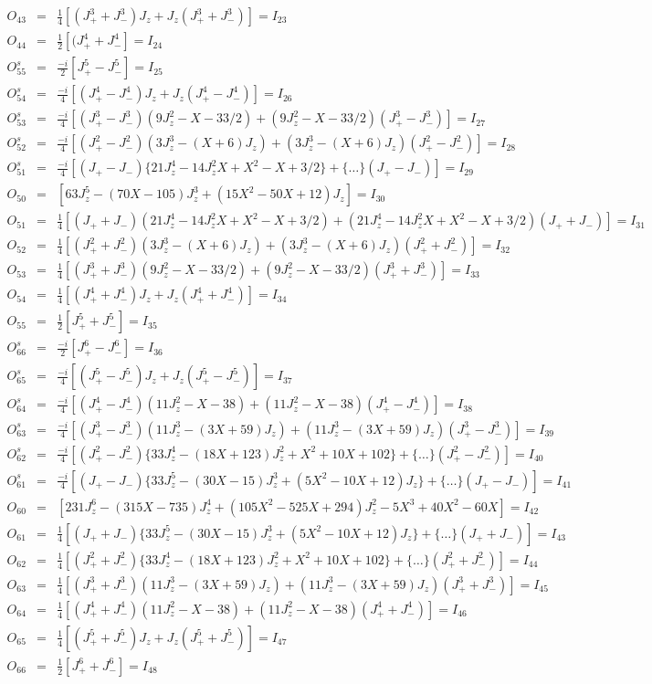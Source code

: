 \documentclass[twoside]{article}
\def\lthtmlcheckvsize{\ifdim\ht\sizebox<\vsize 
  \ifdim\wd\sizebox<\hsize\expandafter\hfill\fi \expandafter\vfill
  \else\expandafter\vss\fi}%
\begin{document}
{\begin{eqnarray*}
O_{43}&=&\frac{1}{4}[(J_+^3+J_-^3)J_z+J_z(J_+^3+J_-^3)]=I_{23} \\
O_{44}&=&\frac{1}{2}[(J_+^4+J_-^4]=I_{24}\\
\hline
O^s_{55}&=&\frac{-i}{2}[J_+^5-J_-^5]=I_{25} \\
O^s_{54}&=&\frac{-i}{4}[(J_+^4-J_-^4)J_z+J_z(J_+^4-J_-^4)]=I_{26} \\
O^s_{53}&=&\frac{-i}{4}[(J_+^3-J_-^3)(9J_z^2-X-33/2)+(9J_z^2-X-33/2)(J_+^3-J_-^3)]=I_{27} \\
O^s_{52}&=&\frac{-i}{4}[(J_+^2-J_-^2)(3J_z^3-(X+6)J_z)+(3J_z^3-(X+6)J_z)(J_+^2-J_-^2)]=I_{28}\\
O^s_{51}&=&\frac{-i}{4}[(J_+-J_-)\{21J_z^4-14J_z^2X+X^2-X+3/2\}+\{\dots\}(J_+-J_-)]=I_{29} \\
O_{50}&=&[63J_z^5-(70X-105)J_z^3+(15X^2-50X+12)J_z]=I_{30} \\
O_{51}&=&\frac{1}{4}[(J_++J_-)(21J_z^4-14J_z^2X+X^2-X+3/2)+(21J_z^4-14J_z^2X+X^2-X+3/2)(J_++J_-)]=I_{31} \\
O_{52}&=&\frac{1}{4}[(J_+^2+J_-^2)(3J_z^3-(X+6)J_z)+(3J_z^3-(X+6)J_z)(J_+^2+J_-^2)] =I_{32}\\
O_{53}&=&\frac{1}{4}[(J_+^3+J_-^3)(9J_z^2-X-33/2)+(9J_z^2-X-33/2)(J_+^3+J_-^3)]=I_{33} \\
O_{54}&=&\frac{1}{4}[(J_+^4+J_-^4)J_z+J_z(J_+^4+J_-^4)]=I_{34} \\
O_{55}&=&\frac{1}{2}[J_+^5+J_-^5]=I_{35} \\
\hline
O^s_{66}&=&\frac{-i}{2}[J_+^6-J_-^6]=I_{36}\\
O^s_{65}&=&\frac{-i}{4}[(J_+^5-J_-^5)J_z+J_z(J_+^5-J_-^5)] =I_{37}\\
O^s_{64}&=&\frac{-i}{4}[(J_+^4-J_-^4)(11J_z^2-X-38)+(11J_z^2-X-38)(J_+^4-J_-^4)]=I_{38} \\
O^s_{63}&=&\frac{-i}{4}[(J_+^3-J_-^3)(11J_z^3-(3X+59)J_z)+(11J_z^3-(3X+59)J_z)(J_+^3-J_-^3)]=I_{39} \\
O^s_{62}&=&\frac{-i}{4}[(J_+^2-J_-^2)\{33J_z^4-(18X+123)J_z^2+X^2+10X+102\}+\{\dots\}(J_+^2-J_-^2)]=I_{40} \\
O^s_{61}&=&\frac{-i}{4}[(J_+-J_-)\{33J_z^5-(30X-15)J_z^3+(5X^2-10X+12)J_z\}+\{\dots\}(J_+-J_-)]=I_{41} \\
O_{60}&=&[231J_z^6-(315X-735)J_z^4+(105X^2-525X+294)J_z^2-5X^3+40X^2-60X]=I_{42} \\
O_{61}&=&\frac{1}{4}[(J_++J_-)\{33J_z^5-(30X-15)J_z^3+(5X^2-10X+12)J_z\}+\{\dots\}(J_++J_-)]=I_{43} \\
O_{62}&=&\frac{1}{4}[(J_+^2+J_-^2)\{33J_z^4-(18X+123)J_z^2+X^2+10X+102\}+\{\dots\}(J_+^2+J_-^2)]=I_{44} \\
O_{63}&=&\frac{1}{4}[(J_+^3+J_-^3)(11J_z^3-(3X+59)J_z)+(11J_z^3-(3X+59)J_z)(J_+^3+J_-^3)]=I_{45} \\
O_{64}&=&\frac{1}{4}[(J_+^4+J_-^4)(11J_z^2-X-38)+(11J_z^2-X-38)(J_+^4+J_-^4)]=I_{46} \\
O_{65}&=&\frac{1}{4}[(J_+^5+J_-^5)J_z+J_z(J_+^5+J_-^5)]=I_{47} \\
O_{66}&=&\frac{1}{2}[J_+^6+J_-^6]=I_{48}\\
\end{eqnarray*}%
\lthtmldisplayZ
\lthtmlcheckvsize\clearpage}
\end{document}
